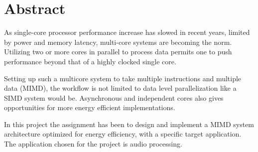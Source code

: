 
\section*{Abstract}

As single-core processor performance increase has slowed in recent years,
limited by power and memory latency, multi-core systems are becoming the norm.
Utilizing two or more cores in parallel to process data permits one to push
performance beyond that of a highly clocked single core. \newline

Setting up such a multicore system to take multiple instructions and multiple
data (MIMD), the workflow is not limited to data level parallelization like a
SIMD system would be. Asynchronous and independent cores also gives
opportunities for more energy efficient implementations. \newline

In this project the assignment has been to design and implement a MIMD system
architecture optimized for energy efficiency, with a specific target
application. The application chosen for the project is audio processing.